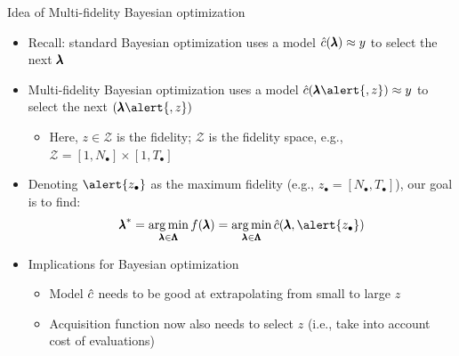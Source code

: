 \begin{frame}[c]{Idea of Multi-fidelity Bayesian optimization }

\begin{itemize}
	\item Recall: standard Bayesian optimization uses a model $\hat{c}(\pmb{\lambda}) \approx y$ to select the next $\pmb{\lambda}$
\pause
\medskip
	\item \alert{Multi-fidelity} Bayesian optimization uses a model $\surro(\conf\alert{, z}) \approx y$ to select the next $(\conf\alert{, z})$
	
	\begin{itemize}
		\item Here, $z\in \mathcal{Z}$ is the fidelity; $\mathcal{Z}$ is the fidelity space, e.g., $\mathcal{Z} = [1, N_{\bullet}] \times  [1, T_{\bullet}]$
	\end{itemize}	 
    \pause
    \bigskip
	
%   


    \item Denoting $\alert{z_{\bullet}}$ as the maximum fidelity (e.g., $z_{\bullet} = [N_{\bullet},T_{\bullet}]$), our goal is to find:
        \begin{equation*}
            \optconf = \argmin_{\conf \in \pcs} \func(\conf) = \argmin_{\conf \in \pcs} \surro(\conf, \alert{z_{\bullet}})
        \end{equation*}

    \pause
    \bigskip

    \item Implications for Bayesian optimization
    \begin{itemize}
    	\item Model $\hat{c}$ needs to be good at \alert{extrapolating} from small to large $z$
		\item Acquisition function now also needs to select $z$ (i.e., take into account cost of evaluations)
	\end{itemize}
\end{itemize}




\end{frame}
